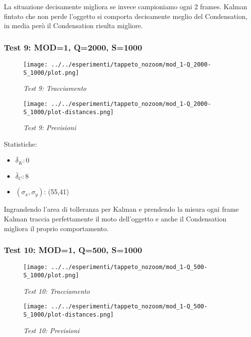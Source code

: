 La situazione decisamente migliora se invece campioniamo ogni 2 frames. Kalman fintato che non perde l'oggetto si comporta decisamente meglio del Condensation, in media però il Condensation risulta migliore.


\newpage
\subsubsection{Test 9: MOD=1, Q=2000, S=1000}

\begin{figure}[hb]
\centering
\texttt{[image: ../../esperimenti/tappeto\_nozoom/mod\_1-Q\_2000-S\_1000/plot.png]}
\caption{\textit{Test 9: Tracciamento}}
\end{figure}

\begin{figure}[hb]
\centering
\texttt{[image: ../../esperimenti/tappeto\_nozoom/mod\_1-Q\_2000-S\_1000/plot-distances.png]}
\caption{\textit{Test 9: Previsioni}}
\end{figure}

Statistiche:
\begin{itemize}
\item \begin{math} \bar \delta_K: 0 \end{math}
\item \begin{math} \bar \delta_C: 8 \end{math}
\item \begin{math}(\sigma_x,\sigma_y)\end{math}: (55,41)
\end{itemize}

Ingrandendo l'area di tolleranza per Kalman e prendendo la misura ogni frame Kalman traccia perfettamente il moto dell'oggetto e anche il Condensation migliora il proprio comportamento.

\newpage
\subsubsection{Test 10: MOD=1, Q=500, S=1000}

\begin{figure}[hb]
\centering
\texttt{[image: ../../esperimenti/tappeto\_nozoom/mod\_1-Q\_500-S\_1000/plot.png]}
\caption{\textit{Test 10: Tracciamento}}
\end{figure}

\begin{figure}[hb]
\centering
\texttt{[image: ../../esperimenti/tappeto\_nozoom/mod\_1-Q\_500-S\_1000/plot-distances.png]}
\caption{\textit{Test 10: Previsioni}}
\end{figure}

